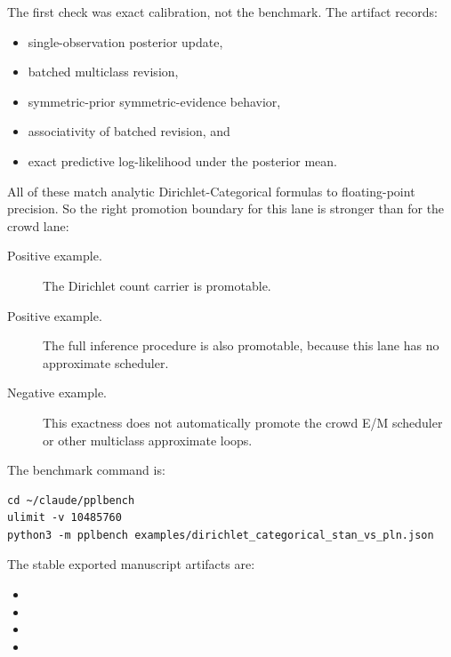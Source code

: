 \documentclass[11pt,openany]{report}
\begin{document}
The first check was exact calibration, not the benchmark.  The artifact
records:
\begin{itemize}
\item single-observation posterior update,
\item batched multiclass revision,
\item symmetric-prior symmetric-evidence behavior,
\item associativity of batched revision, and
\item exact predictive log-likelihood under the posterior mean.
\end{itemize}
All of these match analytic Dirichlet-Categorical formulas to floating-point
precision.  So the right promotion boundary for this lane is stronger than for
the crowd lane:
\begin{description}
\item[Positive example.] The Dirichlet count carrier is promotable.
\item[Positive example.] The full inference procedure is also promotable,
because this lane has no approximate scheduler.
\item[Negative example.] This exactness does not automatically promote the
crowd E/M scheduler or other multiclass approximate loops.
\end{description}

The benchmark command is:
\begin{lstlisting}
cd ~/claude/pplbench
ulimit -v 10485760
python3 -m pplbench examples/dirichlet_categorical_stan_vs_pln.json
\end{lstlisting}

The stable exported manuscript artifacts are:
\begin{itemize}
\item {}
\item {}
\item {}
\item {}
\end{itemize}
\end{document}
